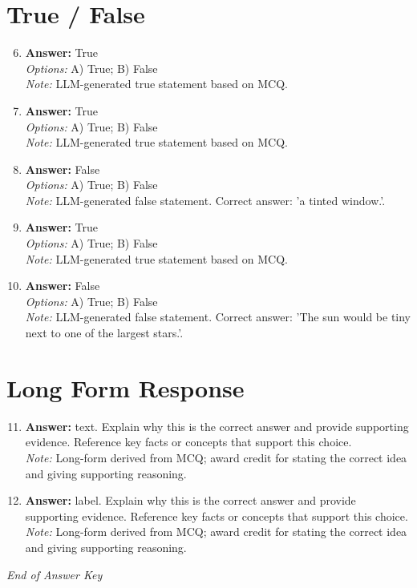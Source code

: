\documentclass[12pt]{article}
\begin{document}
\section*{True / False}
\begin{enumerate}[label=\arabic*.]
\setcounter{enumi}{5}
\item \textbf{Answer:} True
\\ \textit{Options:} A) True; B) False
\\ \textit{Note:} LLM-generated true statement based on MCQ.
\item \textbf{Answer:} True
\\ \textit{Options:} A) True; B) False
\\ \textit{Note:} LLM-generated true statement based on MCQ.
\item \textbf{Answer:} False
\\ \textit{Options:} A) True; B) False
\\ \textit{Note:} LLM-generated false statement. Correct answer: 'a tinted window.'.
\item \textbf{Answer:} True
\\ \textit{Options:} A) True; B) False
\\ \textit{Note:} LLM-generated true statement based on MCQ.
\item \textbf{Answer:} False
\\ \textit{Options:} A) True; B) False
\\ \textit{Note:} LLM-generated false statement. Correct answer: 'The sun would be tiny next to one of the largest stars.'.
\end{enumerate}

\section*{Long Form Response}
\begin{enumerate}[label=\arabic*.]
\setcounter{enumi}{10}
\item \textbf{Answer:} text. Explain why this is the correct answer and provide supporting evidence. Reference key facts or concepts that support this choice.
\\ \textit{Note:} Long-form derived from MCQ; award credit for stating the correct idea and giving supporting reasoning.
\item \textbf{Answer:} label. Explain why this is the correct answer and provide supporting evidence. Reference key facts or concepts that support this choice.
\\ \textit{Note:} Long-form derived from MCQ; award credit for stating the correct idea and giving supporting reasoning.
\end{enumerate}

\vfill
\noindent\textit{End of Answer Key}
\end{document}
